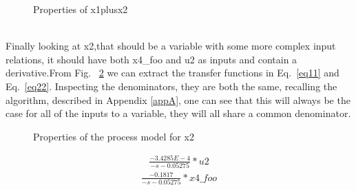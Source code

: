 %
\begin{figure}
\setlength\fboxsep{0pt}
\setlength\fboxrule{0.5pt}
\caption{Properties of x1plusx2}
\label{fig:x1plusx2prop}
\end{figure} 
\\\newline Finally looking at x2,that should be a variable with some more complex input relations, it should have both x4\_foo and u2 as inputs and contain a derivative.From Fig. ~\ref{fig:x2} we can extract the transfer functions in Eq.~\ref{eq11} and Eq.~\ref{eq22}. Inspecting the denominators, they are both the same, recalling the algorithm, described in Appendix \ref{appA}, one can see that this will always be the case for all of the inputs to a variable, they will all share a common denominator.
%
\begin{figure}
\setlength\fboxsep{0pt}
\setlength\fboxrule{0.5pt}
\caption{Properties of the process model for x2}
\label{fig:x2}
\end{figure}
\begin{equation}\begin{array}{rcl} \frac{-3.4285E-4}{-s -0.05275}*u2 \end{array}\label{eq11}\end{equation}
\begin{equation}\begin{array}{rcl} \frac{-0.1817}{-s -0.05275}*x4\_foo \end{array}\label{eq22}\end{equation}
